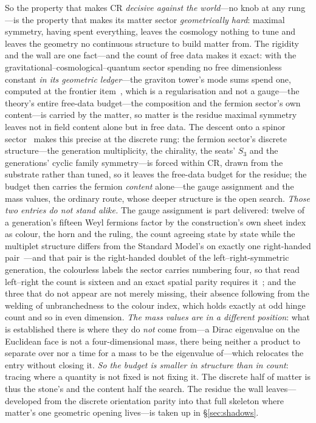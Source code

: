 \documentclass[11pt,a4paper]{article}
\theoremstyle{definition}
\begin{document}
So the property that makes CR \emph{decisive against the world}---no knob at
any rung---is the property that makes its matter sector \emph{geometrically
hard}: maximal symmetry, having spent everything, leaves the cosmology
nothing to tune and leaves the geometry no continuous structure to build
matter from. The rigidity and the wall are one fact---and the count of free
data makes it exact: with the gravitational--cosmological--quantum sector
spending no free dimensionless constant \emph{in its geometric ledger}---the
graviton tower's mode sums spend one, computed at the frontier
item~\cite{JanzenCanonicalTime}, which is a regularisation and not a gauge---the
theory's entire free-data
budget---the composition and the fermion sector's own content---is carried by the matter, so matter is the residue maximal symmetry
leaves not in field content alone but in free data. The descent onto a
spinor sector~\cite{JanzenMatter} makes this precise at the
discrete rung: the fermion sector's discrete structure---the generation
multiplicity, the chirality, the seats' $S_3$ and the generations' cyclic family symmetry---is forced within CR, drawn from the substrate rather than tuned, so
it leaves the free-data budget for the residue; the budget then carries the
fermion \emph{content} alone---the gauge assignment and the mass values, the
ordinary route, whose deeper structure is the open search. \emph{Those two entries do not
stand alike.} The gauge assignment is part delivered: twelve of a generation's
fifteen Weyl fermions factor by the construction's own sheet index as colour,
the horn and the ruling, the count agreeing state by state while the multiplet
structure differs from the Standard Model's on exactly one right-handed
pair~\cite{JanzenMatter}---and that pair is the right-handed doublet of the left--right-symmetric generation, the
colourless labels the sector carries numbering four, so that read left--right the count is sixteen and an exact
spatial parity requires it~\cite{JanzenMatter}; and the three that do not appear are not merely
missing, their absence following from the welding of unbranchedness to the
colour index, which holds exactly at odd hinge count and so in even dimension.
\emph{The mass values are in a different position}: what is established there is
where they do \emph{not} come from---a Dirac eigenvalue on the Euclidean face is
not a four-dimensional mass, there being neither a product to separate over nor
a time for a mass to be the eigenvalue of---which relocates the entry without
closing it.
\emph{So the budget is smaller in structure than in count}: tracing where a
quantity is not fixed is not fixing it. The discrete half
of matter is thus the stone's and the content half the search. The residue the
wall leaves---developed from the discrete orientation parity into that full
skeleton where matter's one geometric opening lives---is taken up in
\S\ref{sec:shadows}.
\end{document}
